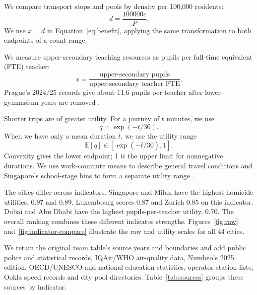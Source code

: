 \documentclass{mcmthesis}
\makeatletter
\renewcommand\subsection{\@startsection{subsection}{2}{\z@}{-1.8ex \@plus -.8ex \@minus -.2ex}{.6ex \@plus .2ex}{\sffamily\large\bfseries\color{Ink}}}
\makeatother
\begin{document}
We compare transport stops and pools by density per 100,000 residents:
\begin{equation}
 d=\frac{100000c}{P}.
 \label{eq:density}
\end{equation}
We use $x=d$ in Equation~\ref{eq:benefit}, applying the same transformation
to both endpoints of a count range.

We measure upper-secondary teaching resources as pupils per
full-time equivalent (FTE) teacher:
\begin{equation}
 x=\frac{\text{upper-secondary pupils}}{\text{upper-secondary teacher FTE}}.
 \label{eq:ptr}
\end{equation}
Prague's 2024/25 records give about 11.6 pupils per teacher after lower-gymnasium
years are removed \cite{prague}.

Shorter trips are of greater utility. For a journey of $t$ minutes, we use
\begin{equation}
 q=\exp(-t/30).
 \label{eq:travel}
\end{equation}
When we have only a mean duration $\bar t$, we use the utility range
\begin{equation}
 \mathbb{E}[q]\in[\exp(-\bar t/30),1].
 \label{eq:travel-range}
\end{equation}
Convexity gives the lower endpoint; 1 is the upper limit for nonnegative
durations. We use work-commute means to describe general travel conditions
and Singapore's school-stage bins to form a separate utility range
\cite{eurostatcommute,singapore}.

The cities differ across indicators. Singapore and Milan have the highest
homicide utilities, 0.97 and 0.89. Luxembourg scores 0.87 and Zurich 0.85
on this indicator. Dubai and Abu Dhabi have the highest pupils-per-teacher
utility, 0.70. The overall ranking combines these different indicator strengths.
Figures~\ref{fig:raw} and~\ref{fig:indicator-compare} illustrate the raw and
utility scales for all 44 cities.

\subsection{Data sources}
We retain the original team table's source years and boundaries \cite{teamtable}
and add public police and statistical records, IQAir/WHO air-quality data,
Numbeo's 2025 edition, OECD/UNESCO and national education statistics,
operator station lists, Ookla speed records and city pool directories.
Table~\ref{tab:sources} groups these sources by indicator.
\end{document}
